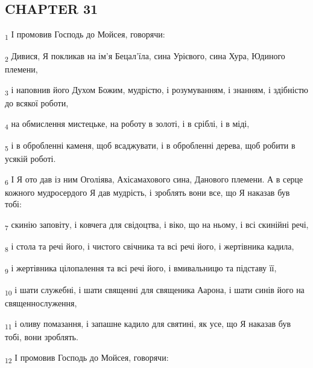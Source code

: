\subsection{CHAPTER 31}
\begin{tcolorbox}
\textsubscript{1} І промовив Господь до Мойсея, говорячи:
\end{tcolorbox}
\begin{tcolorbox}
\textsubscript{2} Дивися, Я покликав на ім'я Бецал'їла, сина Урієвого, сина Хура, Юдиного племени,
\end{tcolorbox}
\begin{tcolorbox}
\textsubscript{3} і наповнив його Духом Божим, мудрістю, і розумуванням, і знанням, і здібністю до всякої роботи,
\end{tcolorbox}
\begin{tcolorbox}
\textsubscript{4} на обмислення мистецьке, на роботу в золоті, і в сріблі, і в міді,
\end{tcolorbox}
\begin{tcolorbox}
\textsubscript{5} і в обробленні каменя, щоб всаджувати, і в обробленні дерева, щоб робити в усякій роботі.
\end{tcolorbox}
\begin{tcolorbox}
\textsubscript{6} І Я ото дав із ним Оголіява, Ахісамахового сина, Данового племени. А в серце кожного мудросердого Я дав мудрість, і зроблять вони все, що Я наказав був тобі:
\end{tcolorbox}
\begin{tcolorbox}
\textsubscript{7} скинію заповіту, і ковчега для свідоцтва, і віко, що на ньому, і всі скинійні речі,
\end{tcolorbox}
\begin{tcolorbox}
\textsubscript{8} і стола та речі його, і чистого свічника та всі речі його, і жертівника кадила,
\end{tcolorbox}
\begin{tcolorbox}
\textsubscript{9} і жертівника цілопалення та всі речі його, і вмивальницю та підставу її,
\end{tcolorbox}
\begin{tcolorbox}
\textsubscript{10} і шати служебні, і шати священні для священика Аарона, і шати синів його на священнослуження,
\end{tcolorbox}
\begin{tcolorbox}
\textsubscript{11} і оливу помазання, і запашне кадило для святині, як усе, що Я наказав був тобі, вони зроблять.
\end{tcolorbox}
\begin{tcolorbox}
\textsubscript{12} І промовив Господь до Мойсея, говорячи:
\end{tcolorbox}
